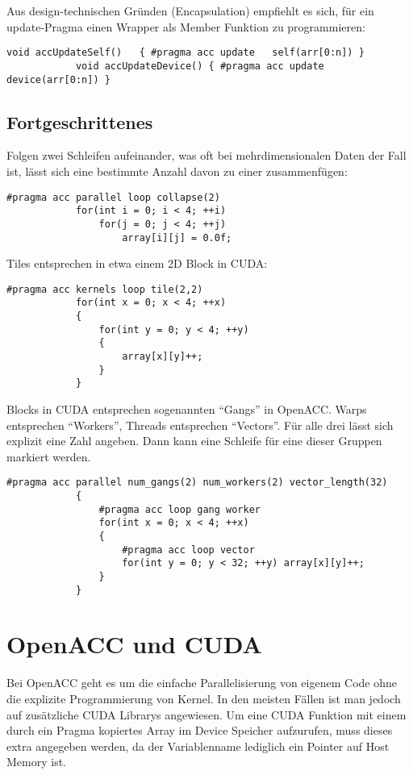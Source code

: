 			Aus design-technischen Gründen (Encapsulation) empfiehlt es sich, für ein update-Pragma einen Wrapper als Member Funktion zu programmieren:
			
			\begin{lstlisting}[caption=OpenACC: Update Member-Funktion]
			void accUpdateSelf()   { #pragma acc update   self(arr[0:n]) }
			void accUpdateDevice() { #pragma acc update device(arr[0:n]) }			
			\end{lstlisting}

			\subsection{Fortgeschrittenes}
			Folgen zwei Schleifen aufeinander, was oft bei mehrdimensionalen Daten der Fall ist, lässt sich eine bestimmte Anzahl davon zu einer zusammenfügen:
			
			\begin{lstlisting}[caption=OpenACC: Loop Collapse]
			#pragma acc parallel loop collapse(2)
			for(int i = 0; i < 4; ++i) 
				for(j = 0; j < 4; ++j)
					array[i][j] = 0.0f;
			\end{lstlisting}
			
			\newpage
			
			Tiles entsprechen in etwa einem 2D \Gls{Block} in CUDA:
			
			\begin{lstlisting}[caption=OpenACC: Tile]
			#pragma acc kernels loop tile(2,2)
			for(int x = 0; x < 4; ++x)
			{
				for(int y = 0; y < 4; ++y)
				{
					array[x][y]++;
				}
			}
			\end{lstlisting}
			
			\Glspl{Block} in CUDA entsprechen sogenannten \enquote{\Glspl{Gang}} in OpenACC. \Glspl{Warp} entsprechen \enquote{\Glspl{Worker}}, \Glspl{Thread} entsprechen \enquote{\Glspl{Vector}}. Für alle drei lässt sich explizit eine Zahl angeben. Dann kann eine Schleife für eine dieser Gruppen markiert werden.
			
			\begin{lstlisting}[caption=OpenACC: Gangs Workers Vectors]
			#pragma acc parallel num_gangs(2) num_workers(2) vector_length(32)
			{
				#pragma acc loop gang worker
				for(int x = 0; x < 4; ++x)
				{
					#pragma acc loop vector
					for(int y = 0; y < 32; ++y) array[x][y]++;
				}
			}			
			\end{lstlisting}
			
		\section{OpenACC und CUDA}
		Bei OpenACC geht es um die einfache Parallelisierung von eigenem Code ohne die explizite Programmierung von \Gls{Kernel}. In den meisten Fällen ist man jedoch auf zusätzliche CUDA Librarys angewiesen. Um eine CUDA Funktion mit einem durch ein Pragma kopiertes Array im Device Speicher aufzurufen, muss dieses extra angegeben werden, da der Variablenname lediglich ein Pointer auf Host Memory ist.
		
